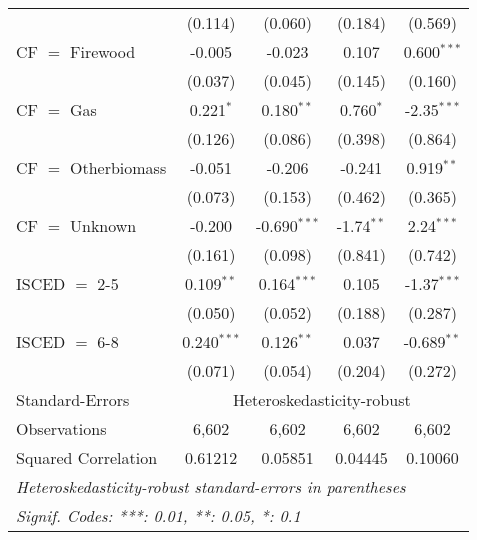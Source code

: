 \begin{table}[htbp!]
\begin{adjustbox}{width = 1\textwidth, max height = 0.95\textheight, center}
\begin{threeparttable}[b]
\begin{tabular}{lcccc}
                                 & (0.114)            & (0.060)            & (0.184)        & (0.569)\\   
            CF $=$ Firewood      & -0.005             & -0.023             & 0.107          & 0.600$^{***}$\\   
                                 & (0.037)            & (0.045)            & (0.145)        & (0.160)\\   
            CF $=$ Gas           & 0.221$^{*}$        & 0.180$^{**}$       & 0.760$^{*}$    & -2.35$^{***}$\\   
                                 & (0.126)            & (0.086)            & (0.398)        & (0.864)\\   
            CF $=$ Otherbiomass  & -0.051             & -0.206             & -0.241         & 0.919$^{**}$\\   
                                 & (0.073)            & (0.153)            & (0.462)        & (0.365)\\   
            CF $=$ Unknown       & -0.200             & -0.690$^{***}$     & -1.74$^{**}$   & 2.24$^{***}$\\   
                                 & (0.161)            & (0.098)            & (0.841)        & (0.742)\\   
            ISCED $=$ 2-5        & 0.109$^{**}$       & 0.164$^{***}$      & 0.105          & -1.37$^{***}$\\   
                                 & (0.050)            & (0.052)            & (0.188)        & (0.287)\\   
            ISCED $=$ 6-8        & 0.240$^{***}$      & 0.126$^{**}$       & 0.037          & -0.689$^{**}$\\   
                                 & (0.071)            & (0.054)            & (0.204)        & (0.272)\\   
            \midrule 
            Standard-Errors & \multicolumn{4}{c}{Heteroskedasticity-robust} \\ 
            Observations         & 6,602              & 6,602              & 6,602          & 6,602\\  
            Squared Correlation  & 0.61212            & 0.05851            & 0.04445        & 0.10060\\  
            \midrule \midrule
            \multicolumn{5}{l}{\emph{Heteroskedasticity-robust standard-errors in parentheses}}\\
            \multicolumn{5}{l}{\emph{Signif. Codes: ***: 0.01, **: 0.05, *: 0.1}}\\
         \end{tabular}
         

\end{threeparttable}
\end{adjustbox}
\end{table}
